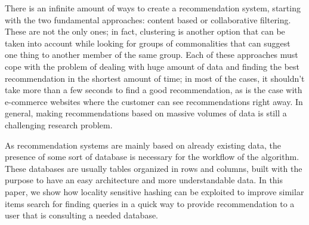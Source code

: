 There is an infinite amount of ways to create a recommendation system, starting with the two fundamental approaches: content based or collaborative filtering. These are not the only ones; in fact, clustering is another option that can be taken into account while looking for groups of commonalities that can suggest one thing to another member of the same group. Each of these approaches must cope with the problem of dealing with huge amount of data and finding the best recommendation in the shortest amount of time; in most of the cases, it shouldn't take more than a few seconds to find a good recommendation, as is the case with e-commerce websites where the customer can see recommendations right away. In general, making recommendations based on massive volumes of data is still a challenging research problem. 

As recommendation systems are mainly based on already existing data, the presence of some sort of database is necessary for the workflow of the algorithm.
These databases are usually tables organized in rows and columns, built with the purpose to have an easy architecture and more understandable data. In this paper, we show how locality sensitive hashing can be exploited to improve similar items search for finding queries in a quick way to provide recommendation to a user that is consulting a needed database.


